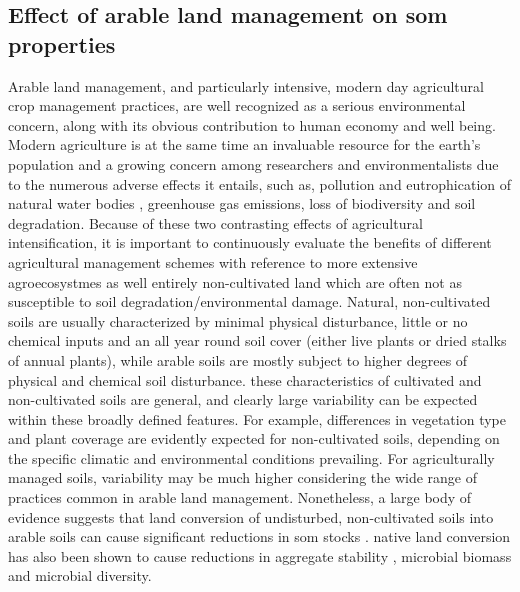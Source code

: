	\subsection{Effect of arable land management on \gls{som} properties}
		Arable land management, and particularly intensive, modern day agricultural crop management practices, are well recognized as a serious environmental concern, along with its obvious contribution to human economy and well being.
		Modern agriculture is at the same time an invaluable resource for the earth’s population and a growing concern among researchers and environmentalists due to the numerous adverse effects it entails, such as, pollution and eutrophication of natural water bodies \citep{liu2012,rabalais2002}, greenhouse gas emissions\citep{vermeulen2012}, loss of biodiversity \citep{laurance2014} and soil degradation\citep{grunwald2011}.
		Because of these two contrasting effects of agricultural intensification, it is important to continuously evaluate the benefits of different agricultural management schemes with reference to more extensive agroecosystmes as well entirely non-cultivated land which are often not as susceptible to soil degradation/environmental damage.
		Natural, non-cultivated soils are usually characterized by minimal physical disturbance, little or no chemical inputs and an all year round soil cover (either live plants or dried stalks of annual plants), while arable soils are mostly subject to higher degrees of physical and chemical soil disturbance.
		these characteristics of cultivated and non-cultivated soils are general, and clearly large variability can be expected within these broadly defined features. For example, differences in vegetation type and plant coverage are evidently expected for non-cultivated soils, depending on the specific climatic and environmental conditions prevailing. For agriculturally managed soils, variability may be much higher considering the wide range of practices common in arable land management.
		Nonetheless, a large body of evidence suggests that land conversion of undisturbed, non-cultivated soils into arable soils can cause significant reductions in \gls{som} stocks \citep{ashagrie2007, spaccini2001, ogle2005}.
		native land conversion has also been shown to cause reductions in aggregate stability \citep{bongiovanni2006, cambardella1993,  elliott1986}, microbial biomass \citep{mganga2016, soleimani2019} and microbial diversity\citep{monkai2018}.
